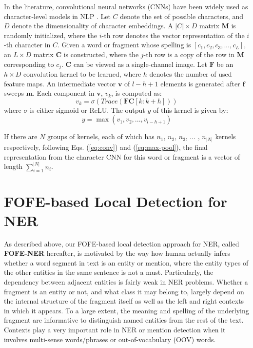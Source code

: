 \documentclass[11pt,a4paper]{article}
\begin{document}
In the literature, convolutional neural networks (CNNs) have been widely used as character-level models in NLP \cite{kim2015character}. 
Let $C$ denote the set of possible characters, and $D$ denote the dimensionality of character embeddings.
A $|C| \times D$ matrix $\bm{M}$ is randomly initialized, where the $i$-th row denotes the vector representation of the $i$-th character in $C$. Given a word or fragment whose spelling is $[c_1, c_2, c_3, ..., c_L]$, 
an $L \times D$ matrix $\bm{C}$ is constructed,  where the $j$-th row is a copy of the row in  $\bm{M}$ corresponding to $c_j$. $\bm{C}$ can be viewed as a single-channel image. 
Let $\bm{F}$ be an $h \times D$ convolution kernel to be learned,  where $h$ denotes the number of used feature maps. 
An intermediate vector $\bm{v}$ of $l-h+1$ elements is generated after $\bm{f}$ sweeps $\bm{m}$. Each component in $\bm{v}$,  $v_k$,  is computed as:
\begin{equation}
\label{eq:conv}
v_k = \sigma(Trace(\bm{F}\bm{C}[k:k+h]))
\end{equation}
where $\sigma$ is either sigmoid or ReLU.
The output  $y$ of this kernel is given by:
\begin{equation}
\label{eq:max-pool}
y = \max(v_1, v_2, ..., v_{l-h+1})
\end{equation}

If there are $N$ groups of kernels, each of which has $n_1$, $n_2$, $n_3$, ... , ${n_{|N|}}$ kernels respectively,
following Eqs. (\ref{eq:conv}) and (\ref{eq:max-pool}), the final representation from the character CNN for this word or fragment is a vector of length $\sum_{i=1}^{|N|} n_{i}$.

\section{FOFE-based Local Detection for NER}

As described above, our FOFE-based local detection approach for NER, called  \textbf{FOFE-NER} hereafter, 
is motivated by the way how human actually infers whether a word segment in text is an entity or mention, where  
the entity types of the other entities in the same sentence is not a must.
Particularly, the dependency between adjacent entities is fairly weak in NER problems. 
Whether a fragment is an entity or not, and what class it may belong to, largely depend on
the internal structure of the fragment itself as well as the left and right contexts  in which it appears. 
To a large extent, the meaning and spelling of the underlying fragment 
are informative to distinguish named entities from the rest of the text. 
Contexts play a very important role in NER or mention detection 
when it involves multi-sense words/phrases or out-of-vocabulary (OOV) words. 
\end{document}
